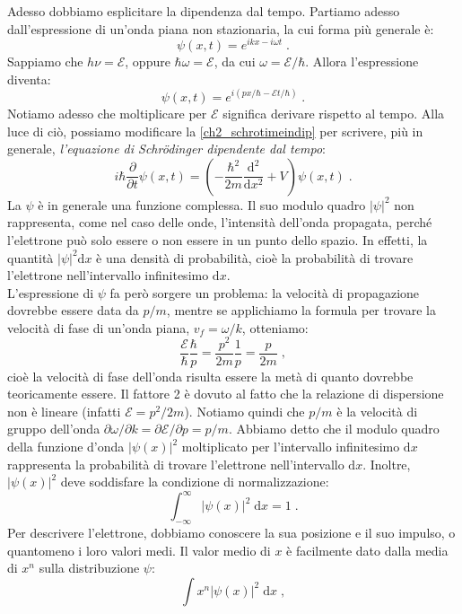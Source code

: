 \documentclass[12pt,a4paper]{report}
\theoremstyle{definition}
\numberwithin{equation}{section}
\newcommand{\diff}[1][]{\mathrm{d}#1}
\begin{document}
Adesso dobbiamo esplicitare la dipendenza dal tempo. Partiamo adesso dall'espressione di un'onda piana non stazionaria, la cui forma più generale è:
$$
\psi(x,t)=e^{ikx-i\omega t}\;.
$$
Sappiamo che $h\nu=\mathcal{E}$, oppure $\hbar\omega=\mathcal{E}$, da cui $\omega=\mathcal{E}/\hbar$. Allora l'espressione diventa:
$$
\psi(x,t)=e^{i(px/\hbar-\mathcal{E}t/\hbar)}\;.
$$
Notiamo adesso che moltiplicare per $\mathcal{E}$ significa derivare rispetto al tempo. Alla luce di ciò, possiamo modificare la \eqref{ch2_schrotimeindip} per scrivere, più in generale, \textit{l'equazione di Schrödinger dipendente dal tempo}:
\begin{equation}
i\hbar\frac{\partial}{\partial t}\psi(x,t)=\left(-\frac{\hbar^2}{2m}\frac{\mathrm{d}^2}{\diff{x}^2}+V\right)\psi(x,t)\;. \label{ch2_schrotimedip}
\end{equation}
La $\psi$ è in generale una funzione complessa. Il suo modulo quadro $|\psi|^2$ non rappresenta, come nel caso delle onde, l'intensità dell'onda propagata, perché l'elettrone può solo essere o non essere in un punto dello spazio. In effetti, la quantità $|\psi|^2\diff{x}$ è una densità di probabilità, cioè la probabilità di trovare l'elettrone nell'intervallo infinitesimo $\diff{x}$. \\
L'espressione di $\psi$ fa però sorgere un problema: la velocità di propagazione dovrebbe essere data da $p/m$, mentre se applichiamo la formula per trovare la velocità di fase di un'onda piana, $v_f=\omega/k$, otteniamo:
$$
\frac{\mathcal{E}}{\hbar}\frac{\hbar}{p}=\frac{p^2}{2m}\frac{1}{p}=\frac{p}{2m}\;,
$$
cioè la velocità di fase dell'onda risulta essere la metà di quanto dovrebbe teoricamente essere. Il fattore 2 è dovuto al fatto che la relazione di dispersione non è lineare (infatti $\mathcal{E}=p^2/2m$). Notiamo quindi che $p/m$ è la velocità di gruppo dell'onda $\partial\omega/\partial k=\partial\mathcal{E}/\partial p=p/m$.
\linebreak
Abbiamo detto che il modulo quadro della funzione d'onda $|\psi(x)|^2$ moltiplicato per l'intervallo infinitesimo $\diff{x}$ rappresenta la probabilità di trovare l'elettrone nell'intervallo $\diff{x}$. Inoltre, $|\psi(x)|^2$ deve soddisfare la condizione di normalizzazione:
$$
\int_{-\infty}^{\infty} |\psi(x)|^2\;\diff{x}=1\;.
$$
Per descrivere l'elettrone, dobbiamo conoscere la sua posizione e il suo impulso, o quantomeno i loro valori medi. Il valor medio di $x$ è facilmente dato dalla media di $x^n$ sulla distribuzione $\psi$:
\begin{equation}
\int x^n|\psi(x)|^2\;\diff{x}\;,
\end{equation}
\end{document}
